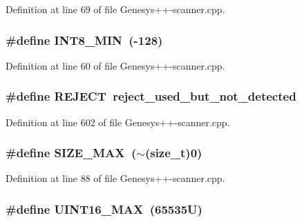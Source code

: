 Definition at line 69 of file Genesys++-\/scanner.\-cpp.

\hypertarget{_genesys_09_09-scanner_8cpp_aadcf2a81af243df333b31efa6461ab8e}{
\subsubsection[{I\-N\-T8\-\_\-\-M\-I\-N}]{\setlength{\rightskip}{0pt plus 5cm}\#define I\-N\-T8\-\_\-\-M\-I\-N~(-\/128)}}\label{_genesys_09_09-scanner_8cpp_aadcf2a81af243df333b31efa6461ab8e}


Definition at line 60 of file Genesys++-\/scanner.\-cpp.

\hypertarget{_genesys_09_09-scanner_8cpp_a835f10dd1ab4bf9a80c4cd80ee6e3058}{
\subsubsection[{R\-E\-J\-E\-C\-T}]{\setlength{\rightskip}{0pt plus 5cm}\#define R\-E\-J\-E\-C\-T~reject\-\_\-used\-\_\-but\-\_\-not\-\_\-detected}}\label{_genesys_09_09-scanner_8cpp_a835f10dd1ab4bf9a80c4cd80ee6e3058}


Definition at line 602 of file Genesys++-\/scanner.\-cpp.

\hypertarget{_genesys_09_09-scanner_8cpp_a3c75bb398badb69c7577b21486f9963f}{
\subsubsection[{S\-I\-Z\-E\-\_\-\-M\-A\-X}]{\setlength{\rightskip}{0pt plus 5cm}\#define S\-I\-Z\-E\-\_\-\-M\-A\-X~($\sim$(size\-\_\-t)0)}}\label{_genesys_09_09-scanner_8cpp_a3c75bb398badb69c7577b21486f9963f}


Definition at line 88 of file Genesys++-\/scanner.\-cpp.

\hypertarget{_genesys_09_09-scanner_8cpp_a3ea490c9b3617d4479bd80ef93cd5602}{
\subsubsection[{U\-I\-N\-T16\-\_\-\-M\-A\-X}]{\setlength{\rightskip}{0pt plus 5cm}\#define U\-I\-N\-T16\-\_\-\-M\-A\-X~(65535\-U)}}\label{_genesys_09_09-scanner_8cpp_a3ea490c9b3617d4479bd80ef93cd5602}


